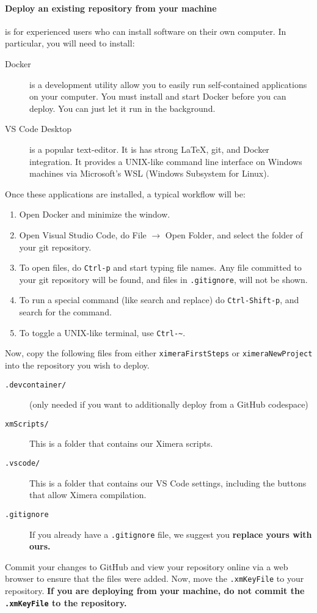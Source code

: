 \documentclass{ximera}
\begin{document}
\paragraph{Deploy an existing repository from your machine} is for experienced
users who can install software on their own computer. In particular, you will need to install:
\begin{description}
    \item[Docker] is a development utility allow you to easily run self-contained applications on your
computer. You must install and start Docker before you can deploy. You can just let
it run in the background. 
\item[VS Code Desktop] is a popular text-editor. It is has strong \LaTeX, git,
and Docker integration. It provides a UNIX-like command line interface on
Windows machines via Microsoft's WSL (Windows Subsystem for Linux).
\end{description}
Once these applications are installed, a typical workflow will be:
\begin{enumerate}
    \item Open Docker and minimize the window.
    \item Open Visual Studio Code, do File $\to$ Open Folder, and select the
          folder of your git repository.
    \item To open files, do \verb!Ctrl-p! and start typing file names. Any
          file
          committed to your git repository will be found, and files in
          \verb!.gitignore!, will not be shown.
    \item To run a special command (like search and replace) do
          \verb!Ctrl-Shift-p!, and search for the command.
    \item To toggle a UNIX-like terminal, use \verb!Ctrl-~!.
\end{enumerate}

Now, copy the following files from either \verb!ximeraFirstSteps! or \verb!ximeraNewProject!
into the repository you wish to deploy.
\begin{description}
    \item[\texttt{.devcontainer/}] (only needed if you want to additionally deploy from
          a GitHub codespace)
    \item[\texttt{xmScripts/}] This is a folder that contains our Ximera
        scripts.
    \item[\texttt{.vscode/}] This is a folder that contains our VS Code
        settings, including the buttons that allow Ximera compilation.
    \item[\texttt{.gitignore}]	If you already have a \verb|.gitignore| file,
        we suggest
        you \textbf{replace yours with ours.}
\end{description}
Commit your changes to GitHub and view your repository online via a web browser
to ensure that the files were added. Now, move the \verb!.xmKeyFile! to your repository.
\textbf{If you are deploying from your machine, do not commit the \texttt{.xmKeyFile} to the repository.}
\end{document}
